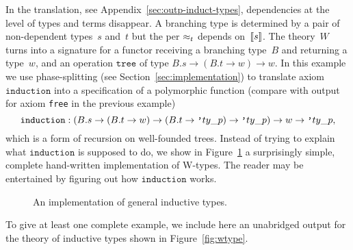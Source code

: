 In the translation, see Appendix~\ref{sec:outp-induct-types},
dependencies at the level of types and terms disappear. A branching
type is determined by a pair of non-dependent types~$s$ and~$t$ but
the per $\approx_t$ depends on~$[\![s]\!]$. The theory~$W$ turns into a
signature for a functor receiving a branching type~$B$ and returning a
type~$w$, and an operation $\mathtt{tree}$ of type $B.s \to (B.t \to
w) \to w$. In this example we use phase-splitting (see
Section~\ref{sec:implementation}) to translate axiom
$\mathtt{induction}$ into a specification of a polymorphic function
(compare with output for axiom \texttt{free} in the previous example)
%
\begin{equation*}
  \mathtt{induction}:
  (B.s \to (B.t \to w) \to (B.t \to \poly{ty\_p}) \to \poly{ty\_p}) \to w \to \poly{ty\_p},
\end{equation*}
%
which is a form of recursion on well-founded trees. Instead of trying
to explain what $\mathtt{induction}$ is supposed to do, we show in
Figure~\ref{fig:wtype-implementation} a surprisingly simple, complete
hand-written implementation of W-types. The reader may be entertained
by figuring out how $\mathtt{induction}$ works.
%
\begin{figure}
  \centering
  \caption{An implementation of general inductive types.}
  \label{fig:wtype-implementation}
\end{figure}

\iflong
%
To give at least one complete example, we include here an
unabridged output for the theory of inductive types shown in
Figure~\ref{fig:wtype}.

\fi %


